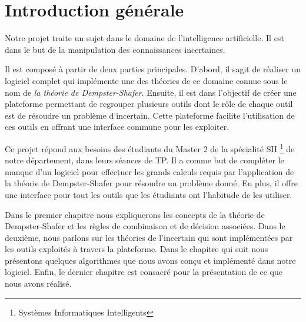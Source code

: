 {}
\chapter*{Introduction générale}

Notre projet traite un sujet dans le domaine de l'intelligence artificielle. Il est dans le but de la
manipulation des connaissances incertaines.

Il est composé à partir de deux parties principales. D'abord, il sagit de réaliser un logiciel complet qui
implémente une des théories de ce domaine connue sous le nom de \emph{la théorie de Dempster-Shafer}. Ensuite,
il est dans l'objectif de créer une plateforme permettant de regrouper plusieurs outils dont le rôle de chaque outil est de
résoudre un problème d'incertain. Cette plateforme facilite l'utilisation de ces outils en offrant une interface
commune pour les exploiter.

Ce projet répond aux besoins des étudiants du Master 2 de la spécialité SII \footnote{Systèmes Informatiques Intelligents}
de notre département, dans leurs séances de TP. Il a comme but de compléter le manque d'un logiciel pour
effectuer les grands calculs requis par l'application de la théorie de Dempster-Shafer pour résoudre un
problème donné. En plus, il offre une interface pour tout les outils que les étudiants ont l'habitude de les utiliser.

Dans le premier chapitre nous expliquerons les concepts de la théorie de Dempster-Shafer et les règles de combinaison
et de décision associées. Dans le deuxième, nous parlons sur les théories de l'incertain qui sont implémentées
par les outils exploités à travers la plateforme. Dans le chapitre qui suit nous présentons quelques algorithmes que
nous avons conçu et implémenté dans notre logiciel. Enfin, le dernier chapitre est consacré pour la présentation de ce que
nous avons réalisé.